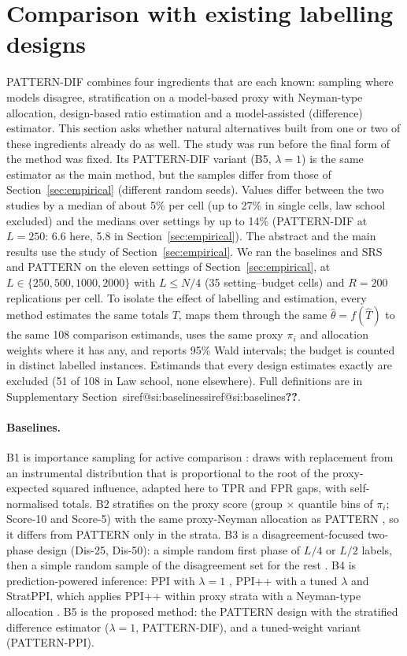 \documentclass[pdflatex,sn-mathphys-num,iicol]{sn-jnl}
\makeatletter
\theoremstyle{thmstyleone}
\theoremstyle{thmstyletwo}
\theoremstyle{thmstylethree}
\newcommand{\SIref}[1]{\ifcsname siref@#1\endcsname\csname siref@#1\endcsname\else\textbf{??}\fi}
\makeatother
\begin{document}
\section{Comparison with existing labelling designs}\label{sec:baselines}

PATTERN-DIF combines four ingredients that are each known: sampling where models disagree, stratification on a model-based proxy with Neyman-type allocation, design-based ratio estimation and a model-assisted (difference) estimator. This section asks whether natural alternatives built from one or two of these ingredients already do as well. The study was run before the final form of the method was fixed. Its PATTERN-DIF variant (B5, $\lambda=1$) is the same estimator as the main method, but the samples differ from those of Section~\ref{sec:empirical} (different random seeds). Values differ between the two studies by a median of about 5\% per cell (up to 27\% in single cells, law school excluded) and the medians over settings by up to 14\% (PATTERN-DIF at $L=250$: 6.6 here, 5.8 in Section~\ref{sec:empirical}). The abstract and the main results use the study of Section~\ref{sec:empirical}. We ran the baselines and SRS and PATTERN on the eleven settings of Section~\ref{sec:empirical}, at $L\in\{250,500,1000,2000\}$ with $L\le N/4$ (35 setting--budget cells) and $R=200$ replications per cell. To isolate the effect of labelling and estimation, every method estimates the same totals $T$, maps them through the same $\hat\theta=f(\hat T)$ to the same 108 comparison estimands, uses the same proxy $\pi_i$ and allocation weights where it has any, and reports 95\% Wald intervals; the budget is counted in distinct labelled instances. Estimands that every design estimates exactly are excluded (51 of 108 in Law school, none elsewhere). Full definitions are in Supplementary Section~\SIref{si:baselines}.

\paragraph{Baselines.} B1 is importance sampling for active comparison \citep{sawade2012active}: draws with replacement from an instrumental distribution that is proportional to the root of the proxy-expected squared influence, adapted here to TPR and FPR gaps, with self-normalised totals. B2 stratifies on the proxy score (group $\times$ quantile bins of $\pi_i$; Score-10 and Score-5) with the same proxy-Neyman allocation as PATTERN \citep{bennett2010online,kumar2018classifier}, so it differs from PATTERN only in the strata. B3 is a disagreement-focused two-phase design (Dis-25, Dis-50): a simple random first phase of $L/4$ or $L/2$ labels, then a simple random sample of the disagreement set for the rest \citep{sawade2012active,musgrove2023discordant}. B4 is prediction-powered inference: PPI with $\lambda=1$ \citep{angelopoulos2023ppi}, PPI++ with a tuned $\lambda$ \citep{angelopoulos2026ppipp} and StratPPI, which applies PPI++ within proxy strata with a Neyman-type allocation \citep{fisch2024stratppi}. B5 is the proposed method: the PATTERN design with the stratified difference estimator ($\lambda=1$, PATTERN-DIF), and a tuned-weight variant (PATTERN-PPI).
\end{document}
